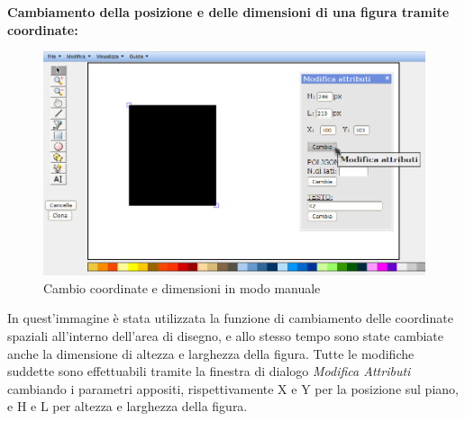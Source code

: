 \textbf{Cambiamento della posizione e delle dimensioni di una figura tramite coordinate:}\\
\begin{figure}[!ht]
\centering
\includegraphics[scale=0.4]{images/dim_pos.png}
\caption{Cambio coordinate e dimensioni in modo manuale}
\end{figure}
 
 
\vspace{50pt}
In quest'immagine \` e stata utilizzata la funzione di cambiamento delle coordinate spaziali all'interno dell'area di disegno, e allo stesso tempo sono state cambiate anche la dimensione di altezza e larghezza della figura. Tutte le modifiche suddette sono effettuabili tramite la finestra di dialogo \textit{Modifica Attributi} cambiando i parametri appositi, rispettivamente X e Y per la posizione sul piano, e H e L per altezza e larghezza della figura.
\newpage
 
 
 
 
